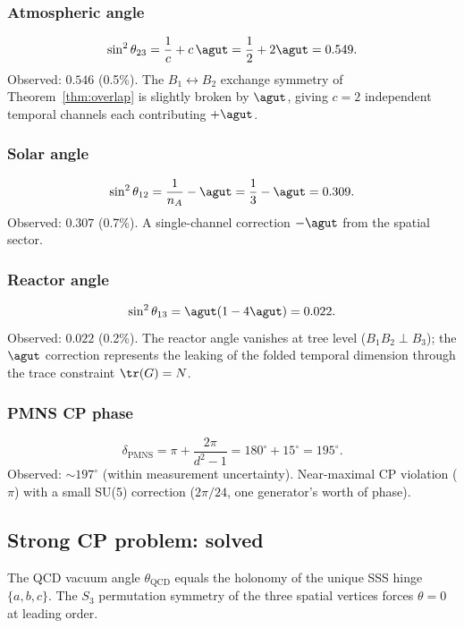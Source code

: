 \subsubsection{Atmospheric angle}
\begin{equation}
\sin^2\theta_{23} = \frac{1}{c} + c\,\agut = \frac{1}{2} + 2\agut = 0.549.
\end{equation}
Observed: $0.546$ (0.5\%). The $B_1 \leftrightarrow B_2$ exchange symmetry of Theorem~\ref{thm:overlap} is slightly broken by $\agut$, giving $c = 2$ independent temporal channels each contributing $+\agut$.

\subsubsection{Solar angle}
\begin{equation}
\sin^2\theta_{12} = \frac{1}{n_A} - \agut = \frac{1}{3} - \agut = 0.309.
\end{equation}
Observed: $0.307$ (0.7\%). A single-channel correction $-\agut$ from the spatial sector.

\subsubsection{Reactor angle}
\begin{equation}
\sin^2\theta_{13} = \agut(1 - 4\agut) = 0.022.
\end{equation}
Observed: $0.022$ (0.2\%). The reactor angle vanishes at tree level ($B_1 B_2 \perp B_3$); the $\agut$ correction represents the leaking of the folded temporal dimension through the trace constraint $\tr(G) = N$.

\subsubsection{PMNS CP phase}
\begin{equation}
\delta_\text{PMNS} = \pi + \frac{2\pi}{d^2 - 1} = 180^\circ + 15^\circ = 195^\circ.
\end{equation}
Observed: $\sim 197^\circ$ (within measurement uncertainty). Near-maximal CP violation ($\pi$) with a small SU(5) correction ($2\pi/24$, one generator's worth of phase).

\subsection{Strong CP problem: solved}

The QCD vacuum angle $\theta_\text{QCD}$ equals the holonomy of the unique SSS hinge $\{a, b, c\}$. The $S_3$ permutation symmetry of the three spatial vertices forces $\theta = 0$ at leading order.

